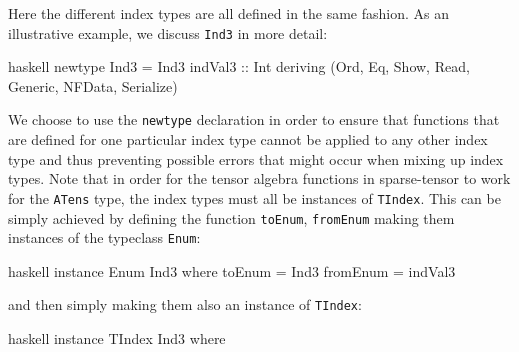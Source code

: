Here the different index types are all defined in the same fashion. As an illustrative example, we discuss \texttt{Ind3} in more detail:
\begin{center}
\begin{cminted}{haskell}
newtype Ind3 =  Ind3 {indVal3 :: Int}
    deriving (Ord, Eq, Show, Read, Generic, NFData, Serialize)
\end{cminted}
\end{center}
We choose to use the \texttt{newtype} declaration in order to ensure that functions that are defined for one particular index type cannot be applied to any other index type and thus preventing possible errors that might occur when mixing up index types.
Note that in order for the tensor algebra functions in sparse-tensor to work for the \texttt{ATens} type, the index types must all be instances of \texttt{TIndex}. This can be simply achieved by defining the function \texttt{toEnum}, \texttt{fromEnum} making them instances of the typeclass \texttt{Enum}: 
\begin{center}
\begin{cminted}{haskell}
instance Enum Ind3 where
    toEnum = Ind3
    fromEnum = indVal3
\end{cminted} 
\end{center}
and then simply making them also an instance of \texttt{TIndex}:

\begin{center}
\begin{cminted}{haskell}
instance TIndex Ind3 where
\end{cminted} 
\end{center}

